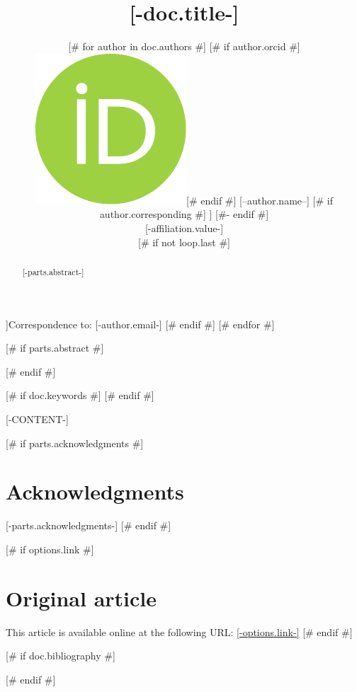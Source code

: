 \documentclass{article}
\title{[-doc.title-]}
\date{\displaydate{articleDate}}
[# else #]
\date{}
[# endif #]
\author{[# for author in doc.authors #]
[# if author.orcid #]\href{https://orcid.org/[-author.orcid-]}{\includegraphics[scale=0.06]{orcid.pdf}}\hspace{1mm}[# endif #]
[--author.name--]
[# if author.corresponding #]
\footnotemark[[-author.corresponding.index-]]
[#- endif #]\\
[# for affiliation in author.affiliations #][-affiliation.value-]\\[# endfor #]
[# if not loop.last #]
\AND
[# endif #]
[# endfor #]
}
\begin{document}
\footnotetext[[-author.corresponding.index-]]{Correspondence to: [-author.email-]}
[# endif #]
[# endfor #]

[# if parts.abstract #]
\begin{abstract}
[-parts.abstract-]
\end{abstract}
[# endif #]

[# if doc.keywords #]
[# endif #]

[-CONTENT-]

[# if parts.acknowledgments #]
\section*{Acknowledgments}
[-parts.acknowledgments-]
[# endif #]

[# if options.link #]
\section*{Original article}
\footnotesize
This article is available online at the following URL: \href{[-options.link-]}{[-options.link-]}
\normalsize
[# endif #]

[# if doc.bibliography #]


[# endif #]
\end{document}

